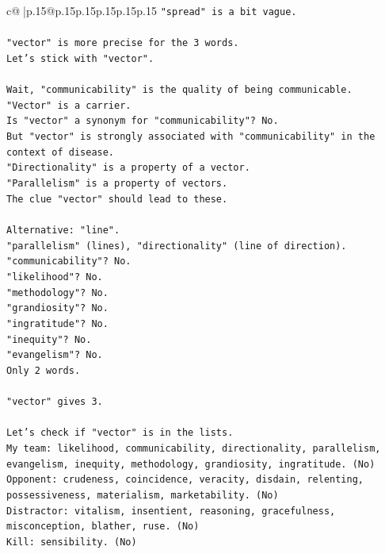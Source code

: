 \documentclass{article}
\begin{document}
{\begin{supertabular}{c@{$\;$}|p{.15\linewidth}@{}p{.15\linewidth}p{.15\linewidth}p{.15\linewidth}p{.15\linewidth}p{.15\linewidth}}
{{{\texttt{"spread" is a bit vague.} \\
\\ 
\texttt{"vector" is more precise for the 3 words.} \\
\texttt{Let's stick with "vector".} \\
\\ 
\texttt{Wait, "communicability" is the quality of being communicable.} \\
\texttt{"Vector" is a carrier.} \\
\texttt{Is "vector" a synonym for "communicability"? No.} \\
\texttt{But "vector" is strongly associated with "communicability" in the context of disease.} \\
\texttt{"Directionality" is a property of a vector.} \\
\texttt{"Parallelism" is a property of vectors.} \\
\texttt{The clue "vector" should lead to these.} \\
\\ 
\texttt{Alternative: "line".} \\
\texttt{"parallelism" (lines), "directionality" (line of direction).} \\
\texttt{"communicability"? No.} \\
\texttt{"likelihood"? No.} \\
\texttt{"methodology"? No.} \\
\texttt{"grandiosity"? No.} \\
\texttt{"ingratitude"? No.} \\
\texttt{"inequity"? No.} \\
\texttt{"evangelism"? No.} \\
\texttt{Only 2 words.} \\
\\ 
\texttt{"vector" gives 3.} \\
\\ 
\texttt{Let's check if "vector" is in the lists.} \\
\texttt{My team: likelihood, communicability, directionality, parallelism, evangelism, inequity, methodology, grandiosity, ingratitude. (No)} \\
\texttt{Opponent: crudeness, coincidence, veracity, disdain, relenting, possessiveness, materialism, marketability. (No)} \\
\texttt{Distractor: vitalism, insentient, reasoning, gracefulness, misconception, blather, ruse. (No)} \\
\texttt{Kill: sensibility. (No)} \\
}}}
\end{supertabular}}
\end{document}
